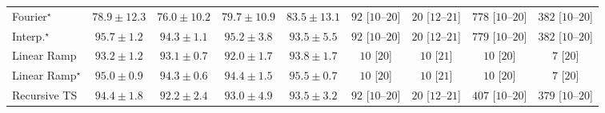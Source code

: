 \begin{tabular}{l|cccc|cccc|}
Fourier$^\star$ & {\cellcolor[HTML]{4A98C5}} \color[HTML]{F1F1F1} $78.9\pm 12.3$ & {\cellcolor[HTML]{69A5CC}} \color[HTML]{F1F1F1} $76.0\pm 10.2$ & {\cellcolor[HTML]{4094C3}} \color[HTML]{F1F1F1} $79.7\pm 10.9$ & {\cellcolor[HTML]{1E80B8}} \color[HTML]{F1F1F1} $83.5\pm 13.1$ & {\cellcolor[HTML]{FDE3E0}} \color[HTML]{000000} $92$ [$10$--$20$] & {\cellcolor[HTML]{FFF4F0}} \color[HTML]{000000} $20$ [$12$--$21$] & {\cellcolor[HTML]{49006A}} \color[HTML]{F1F1F1} $778$ [$10$--$20$] & {\cellcolor[HTML]{F76EA3}} \color[HTML]{F1F1F1} $382$ [$10$--$20$] \\
Interp.$^\star$ & {\cellcolor[HTML]{03456C}} \color[HTML]{F1F1F1} $95.7\pm 1.2$ & {\cellcolor[HTML]{034D79}} \color[HTML]{F1F1F1} $94.3\pm 1.1$ & {\cellcolor[HTML]{034871}} \color[HTML]{F1F1F1} $95.2\pm 3.8$ & {\cellcolor[HTML]{045280}} \color[HTML]{F1F1F1} $93.5\pm 5.5$ & {\cellcolor[HTML]{FDE3E0}} \color[HTML]{000000} $92$ [$10$--$20$] & {\cellcolor[HTML]{FFF4F0}} \color[HTML]{000000} $20$ [$12$--$21$] & {\cellcolor[HTML]{49006A}} \color[HTML]{F1F1F1} $779$ [$10$--$20$] & {\cellcolor[HTML]{F76EA3}} \color[HTML]{F1F1F1} $382$ [$10$--$20$] \\
Linear Ramp & {\cellcolor[HTML]{045483}} \color[HTML]{F1F1F1} $93.2\pm 1.2$ & {\cellcolor[HTML]{045585}} \color[HTML]{F1F1F1} $93.1\pm 0.7$ & {\cellcolor[HTML]{045B8E}} \color[HTML]{F1F1F1} $92.0\pm 1.7$ & {\cellcolor[HTML]{03517E}} \color[HTML]{F1F1F1} $93.8\pm 1.7$ & {\cellcolor[HTML]{FFF7F3}} \color[HTML]{000000} $10$ [$20$] & {\cellcolor[HTML]{FFF7F3}} \color[HTML]{000000} $10$ [$21$] & {\cellcolor[HTML]{FFF7F3}} \color[HTML]{000000} $10$ [$20$] & {\cellcolor[HTML]{FFF7F3}} \color[HTML]{000000} $7$ [$20$] \\
Linear Ramp$^\star$ & {\cellcolor[HTML]{034973}} \color[HTML]{F1F1F1} $95.0\pm 0.9$ & {\cellcolor[HTML]{034D79}} \color[HTML]{F1F1F1} $94.3\pm 0.6$ & {\cellcolor[HTML]{034C78}} \color[HTML]{F1F1F1} $94.4\pm 1.5$ & {\cellcolor[HTML]{03466E}} \color[HTML]{F1F1F1} $95.5\pm 0.7$ & {\cellcolor[HTML]{FFF7F3}} \color[HTML]{000000} $10$ [$20$] & {\cellcolor[HTML]{FFF7F3}} \color[HTML]{000000} $10$ [$21$] & {\cellcolor[HTML]{FFF7F3}} \color[HTML]{000000} $10$ [$20$] & {\cellcolor[HTML]{FFF7F3}} \color[HTML]{000000} $7$ [$20$] \\
Recursive TS & {\cellcolor[HTML]{034C78}} \color[HTML]{F1F1F1} $94.4\pm 1.8$ & {\cellcolor[HTML]{045A8D}} \color[HTML]{F1F1F1} $92.2\pm 2.4$ & {\cellcolor[HTML]{045585}} \color[HTML]{F1F1F1} $93.0\pm 4.9$ & {\cellcolor[HTML]{045280}} \color[HTML]{F1F1F1} $93.5\pm 3.2$ & {\cellcolor[HTML]{FDE3E0}} \color[HTML]{000000} $92$ [$10$--$20$] & {\cellcolor[HTML]{FFF4F0}} \color[HTML]{000000} $20$ [$12$--$21$] & {\cellcolor[HTML]{F361A0}} \color[HTML]{F1F1F1} $407$ [$10$--$20$] & {\cellcolor[HTML]{F770A4}} \color[HTML]{F1F1F1} $379$ [$10$--$20$] \\

\end{tabular}

